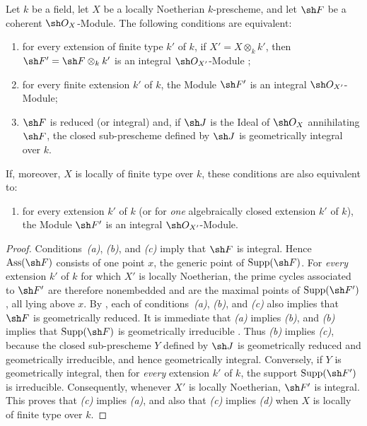 \begin{proposition}[4.6.18]
\label{IV.4.6.18}
Let $k$ be a field, let $X$ be a locally Noetherian $k$-prescheme,
and let $\sh F$ be a coherent $\sh O_X$-Module.
The following conditions are equivalent:
\begin{enumerate}
\item[\rm(a)]
\label{IV.4.6.18.a}
for every extension of finite type $k'$ of $k$, if
$X'=X\otimes_k k'$, then
$\sh F'=\sh F\otimes_k k'$ is an integral
$\sh O_{X'}$-Module ;

\item[\rm(b)]
\label{IV.4.6.18.b}
for every finite extension $k'$ of $k$, the Module $\sh F'$ is an
integral $\sh O_{X'}$-Module;

\item[\rm(c)]
\label{IV.4.6.18.c}
$\sh F$ is reduced (or integral) and, if $\sh J$ is the Ideal of
$\sh O_X$ annihilating $\sh F$, the closed sub-prescheme defined by
$\sh J$ is geometrically integral over $k$.
\end{enumerate}
If, moreover, $X$ is locally of finite type over $k$, these conditions
are also equivalent to:
\begin{enumerate}
\item[\rm(d)]
\label{IV.4.6.18.d}
for every extension $k'$ of $k$
\textup{(or} for \emph{one} algebraically closed extension $k'$ of $k$), the Module
$\sh F'$ is an integral $\sh O_{X'}$-Module.
\end{enumerate}
\end{proposition}

\begin{proof}
Conditions~\emph{(a)}, \emph{(b)}, and \emph{(c)} imply that $\sh F$
is integral.
Hence $\operatorname{Ass}(\sh F)$ consists of one point $x$, the
generic point of $\operatorname{Supp}(\sh F)$.
For \emph{every} extension $k'$ of $k$ for which $X'$ is locally
Noetherian, the prime cycles associated to $\sh F'$ are therefore
nonembedded and are the maximal points of
$\operatorname{Supp}(\sh F')$, all lying above $x$.
By , each of conditions~\emph{(a)}, \emph{(b)}, and
\emph{(c)} also implies that $\sh F$ is geometrically reduced.
It is immediate that \emph{(a)} implies \emph{(b)}, and
\emph{(b)} implies that $\operatorname{Supp}(\sh F)$ is geometrically
irreducible .
Thus \emph{(b)} implies \emph{(c)}, because the closed sub-prescheme
$Y$ defined by $\sh J$ is geometrically reduced and geometrically
irreducible, and hence geometrically integral.
Conversely, if $Y$ is geometrically integral, then for \emph{every} extension
$k'$ of $k$, the support $\operatorname{Supp}(\sh F')$ is
irreducible.
Consequently, whenever $X'$ is locally Noetherian, $\sh F'$ is
integral.
This proves that \emph{(c)} implies \emph{(a)}, and also that
\emph{(c)} implies \emph{(d)} when $X$ is locally of finite type over
$k$.
\end{proof}

